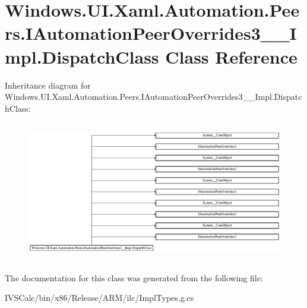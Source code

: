 \hypertarget{class_windows_1_1_u_i_1_1_xaml_1_1_automation_1_1_peers_1_1_i_automation_peer_overrides3_____impl_1_1_dispatch_class}{}\section{Windows.\+U\+I.\+Xaml.\+Automation.\+Peers.\+I\+Automation\+Peer\+Overrides3\+\_\+\+\_\+\+Impl.\+Dispatch\+Class Class Reference}
\label{class_windows_1_1_u_i_1_1_xaml_1_1_automation_1_1_peers_1_1_i_automation_peer_overrides3_____impl_1_1_dispatch_class}
Inheritance diagram for Windows.\+U\+I.\+Xaml.\+Automation.\+Peers.\+I\+Automation\+Peer\+Overrides3\+\_\+\+\_\+\+Impl.\+Dispatch\+Class\+:\begin{figure}[H]
\begin{center}
\leavevmode
\includegraphics[height=6.160000cm]{class_windows_1_1_u_i_1_1_xaml_1_1_automation_1_1_peers_1_1_i_automation_peer_overrides3_____impl_1_1_dispatch_class}
\end{center}
\end{figure}


The documentation for this class was generated from the following file\+:\begin{DoxyCompactItemize}
\item 
I\+V\+S\+Calc/bin/x86/\+Release/\+A\+R\+M/ilc/Impl\+Types.\+g.\+cs\end{DoxyCompactItemize}
